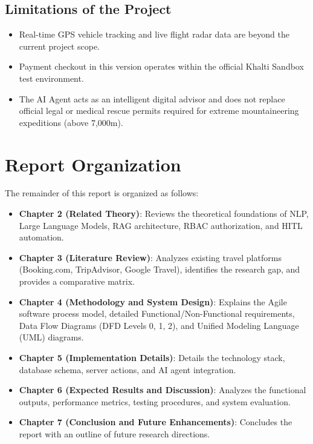 \documentclass[12pt,a4paper]{report}
\begin{document}
\subsection{Limitations of the Project}
\begin{itemize}
    \item Real-time GPS vehicle tracking and live flight radar data are beyond the current project scope.
    \item Payment checkout in this version operates within the official Khalti Sandbox test environment.
    \item The AI Agent acts as an intelligent digital advisor and does not replace official legal or medical rescue permits required for extreme mountaineering expeditions (above 7,000m).
\end{itemize}

\section{Report Organization}
The remainder of this report is organized as follows:
\begin{itemize}
    \item \textbf{Chapter 2 (Related Theory)}: Reviews the theoretical foundations of NLP, Large Language Models, RAG architecture, RBAC authorization, and HITL automation.
    \item \textbf{Chapter 3 (Literature Review)}: Analyzes existing travel platforms (Booking.com, TripAdvisor, Google Travel), identifies the research gap, and provides a comparative matrix.
    \item \textbf{Chapter 4 (Methodology and System Design)}: Explains the Agile software process model, detailed Functional/Non-Functional requirements, Data Flow Diagrams (DFD Levels 0, 1, 2), and Unified Modeling Language (UML) diagrams.
    \item \textbf{Chapter 5 (Implementation Details)}: Details the technology stack, database schema, server actions, and AI agent integration.
    \item \textbf{Chapter 6 (Expected Results and Discussion)}: Analyzes the functional outputs, performance metrics, testing procedures, and system evaluation.
    \item \textbf{Chapter 7 (Conclusion and Future Enhancements)}: Concludes the report with an outline of future research directions.
\end{itemize}

\end{document}
